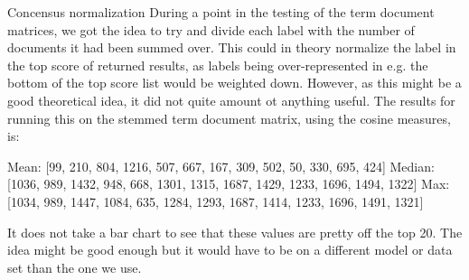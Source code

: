 Concensus normalization
During a point in the testing of the term document matrices, we got the idea to try and divide each label with the number of documents it had been summed over. This could in theory normalize the label in the top score of returned results, as labels being over-represented in e.g. the bottom of the top score list would be weighted down. However, as this might be a good theoretical idea, it did not quite amount ot anything useful. The results for running this on the stemmed term document matrix, using the cosine measures, is:

Mean: [99, 210, 804, 1216, 507, 667, 167, 309, 502, 50, 330, 695, 424]
Median: [1036, 989, 1432, 948, 668, 1301, 1315, 1687, 1429, 1233, 1696, 1494, 1322]
Max: [1034, 989, 1447, 1084, 635, 1284, 1293, 1687, 1414, 1233, 1696, 1491, 1321]

It does not take a bar chart to see that these values are pretty off the top 20. The idea might be good enough but it would have to be on a different model or data set than the one we use.
